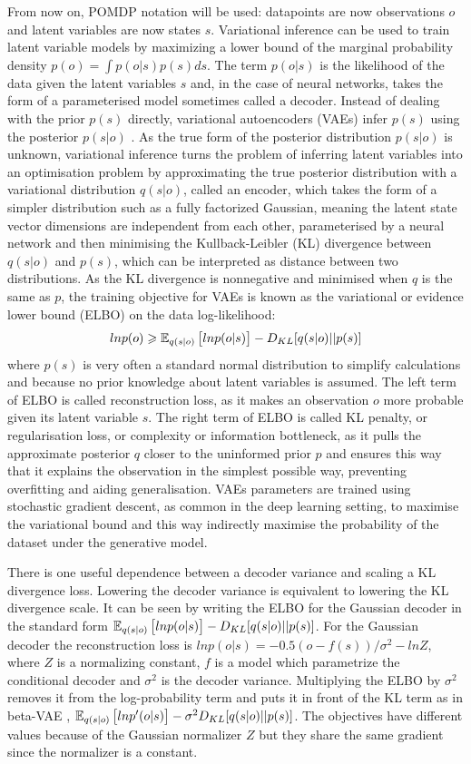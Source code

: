 From now on, POMDP notation will be used: datapoints are now observations $o$ and latent variables are now states $s$. Variational inference can be used to train latent variable models by maximizing a lower bound of the marginal probability density $p(o) = \int p(o|s)p(s)ds$. The term $p(o|s)$ is the likelihood of the data given the latent variables $s$ and, in the case of neural networks, takes the form of a parameterised model sometimes called a decoder. Instead of dealing with the prior $p(s)$ directly, variational autoencoders (VAEs) infer $p(s)$ using the posterior $p(s|o)$ \cite{Algo.VAE}. As the true form of the posterior distribution $p(s|o)$ is unknown, variational inference turns the problem of inferring latent variables into an optimisation problem by approximating the true posterior distribution with a variational distribution $q(s|o)$, called an encoder, which takes the form of a simpler distribution such as a fully factorized Gaussian, meaning the latent state vector dimensions are independent from each other, parameterised by a neural network and then minimising the Kullback-Leibler (KL) divergence between $q(s|o)$ and $p(s)$, which can be interpreted as distance between two distributions. As the KL divergence is nonnegative and minimised when $q$ is the same as $p$, the training objective for VAEs is known as the variational or evidence lower bound (ELBO) on the data log-likelihood:
$$ln p(o) \geqslant \operatorname{\mathbb{E}}_{q(s|o)}\big[ ln p(o|s) \big] - D_{KL}[q(s|o)||p(s)]$$
where $p(s)$ is very often a standard normal distribution to simplify calculations and because no prior knowledge about latent variables is assumed. The left term of ELBO is called reconstruction loss, as it makes an observation $o$ more probable given its latent variable $s$. The right term of ELBO is called KL penalty, or regularisation loss, or complexity or information bottleneck, as it pulls the approximate posterior $q$ closer to the uninformed prior $p$ and ensures this way that it explains the observation in the simplest possible way, preventing overfitting and aiding generalisation. VAEs parameters are trained using stochastic gradient descent, as common in the deep learning setting, to maximise the variational bound and this way indirectly maximise the probability of the dataset under the generative model.

There is one useful dependence between a decoder variance and scaling a KL divergence loss. Lowering the decoder variance is equivalent to lowering the KL divergence scale. It can be seen by writing the ELBO for the Gaussian decoder in the standard form $\operatorname{\mathbb{E}}_{q(s|o)}\big[ ln p(o|s) \big] - D_{KL}[q(s|o)||p(s)]$. For the Gaussian decoder the reconstruction loss is $lnp(o|s) = -0.5(o-f(s))/\sigma^2-lnZ$, where $Z$ is a normalizing constant, $f$ is a model which parametrize the conditional decoder and $\sigma^2$ is the decoder variance. Multiplying the ELBO by $\sigma^2$ removes it from the log-probability term and puts it in front of the KL term as in beta-VAE \cite{Algo.betaVAE}, $\operatorname{\mathbb{E}}_{q(s|o)}\big[ ln p'(o|s) \big] - \sigma^2 D_{KL}[q(s|o)||p(s)]$. The objectives have different values because of the Gaussian normalizer $Z$ but they share the same gradient since the normalizer is a constant.

